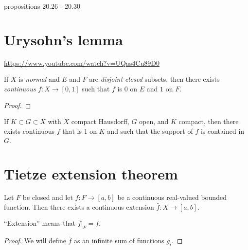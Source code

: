  propositions 20.26 - 20.30


\section{Urysohn's lemma}

\url{https://www.youtube.com/watch?v=UQas4Cu89D0}

\begin{theorem}
  If $X$ is {\it normal} and $E$ and $F$ are {\it disjoint closed} subsets, then there exists {\it continuous}
  $f: X \to [0, 1]$ such that $f$ is $0$ on $E$ and $1$ on $F$.
\end{theorem}

\begin{proof}
\end{proof}

\begin{corollary}
  If $K \subset G \subset X$ with $X$ compact Hausdorff, $G$ open, and $K$ compact, then there exists
  continuous $f$ that is $1$ on $K$ and such that the support of $f$ is contained in $G$.
\end{corollary}

\section{Tietze extension theorem}

\begin{theorem}
  Let $F$ be closed and let $f: F \to [a, b]$ be a continuous real-valued bounded function. Then there exists a
  continuous extension $\bar f: X \to [a, b]$.

  ``Extension​'' means that $\bar f|_F = f$.
\end{theorem}

\begin{proof}
  We will define $\bar f$ as an infinite sum of functions $g_i$.
\end{proof}
